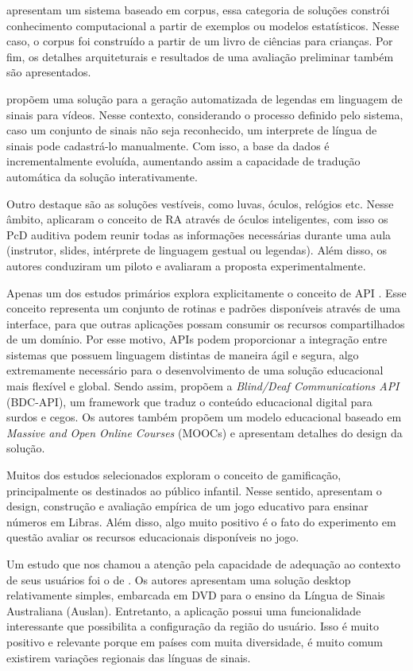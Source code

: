  apresentam um sistema baseado em corpus, essa categoria de soluções constrói conhecimento computacional a partir de exemplos ou modelos estatísticos. Nesse caso, o corpus foi construído a partir de um livro de ciências para crianças. Por fim, os detalhes arquiteturais e resultados de uma avaliação preliminar também são apresentados.

 propõem uma solução para a geração automatizada de legendas em linguagem de sinais para vídeos. Nesse contexto, considerando o processo definido pelo sistema, caso um conjunto de sinais não seja reconhecido, um interprete de língua de sinais pode cadastrá-lo manualmente. Com isso, a base da dados é incrementalmente evoluída, aumentando assim a capacidade de tradução automática da solução interativamente.

Outro destaque são as soluções vestíveis, como luvas, óculos, relógios etc. Nesse âmbito,  aplicaram o conceito de RA através de óculos inteligentes, com isso os PcD auditiva podem reunir todas as informações necessárias durante uma aula (instrutor, slides, intérprete de linguagem gestual ou legendas). Além disso, os autores conduziram um piloto e avaliaram a proposta experimentalmente.

Apenas um dos estudos primários explora explicitamente o conceito de API \cite{INT56}. Esse conceito representa um conjunto de rotinas e padrões disponíveis através de uma interface, para que outras aplicações possam consumir os recursos compartilhados de um domínio. Por esse motivo, APIs podem proporcionar a integração entre sistemas que possuem linguagem distintas de maneira ágil e segura, algo extremamente necessário para o desenvolvimento de uma solução educacional mais flexível e global. Sendo assim,  propõem a \textit{Blind/Deaf Communications API} (BDC-API), um framework que traduz o conteúdo educacional digital para surdos e cegos. Os autores também propõem um modelo educacional baseado em \textit{Massive and Open Online Courses} (MOOCs) e apresentam detalhes do design da solução.

Muitos dos estudos selecionados exploram o conceito de gamificação, principalmente os destinados ao público infantil. Nesse sentido,  apresentam o design, construção e avaliação empírica de um jogo educativo para ensinar números em Libras. Além disso, algo muito positivo é o fato do experimento em questão avaliar os recursos educacionais disponíveis no jogo.

Um estudo que nos chamou a atenção pela capacidade de adequação ao contexto de seus usuários foi o de . Os autores apresentam uma solução desktop relativamente simples, embarcada em DVD para o ensino da Língua de Sinais Australiana (Auslan). Entretanto, a aplicação possui uma funcionalidade interessante que possibilita a configuração da região do usuário. Isso é muito positivo e relevante porque em países com muita diversidade, é muito comum existirem variações regionais das línguas de sinais.


